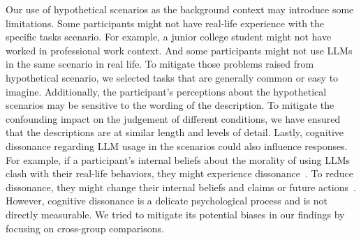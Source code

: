 Our use of hypothetical scenarios as the background context may introduce some limitations.
Some participants might not have real-life experience with the specific tasks scenario. 
For example, a junior college student might not have worked in professional work context. 
And some participants might not use LLMs in the same scenario in real life.
To mitigate those problems raised from hypothetical scenario, we selected tasks that are generally common or easy to imagine.
Additionally, the participant's perceptions about the hypothetical scenarios may be sensitive to the wording of the description.
To mitigate the confounding impact on the judgement of different conditions, we have ensured that the descriptions are at similar length and levels of detail.
Lastly, cognitive dissonance regarding LLM usage in the scenarios could also influence responses.
For example, if a participant's internal beliefs about the morality of using LLMs clash with their real-life behaviors, they might experience dissonance~\cite{festinger1962cognitive}.
To reduce dissonance, they might change their internal beliefs and claims or future actions~\cite{festinger1962cognitive}.
However, cognitive dissonance is a delicate psychological process and is not directly measurable.
We tried to mitigate its potential biases in our findings by focusing on cross-group comparisons.















